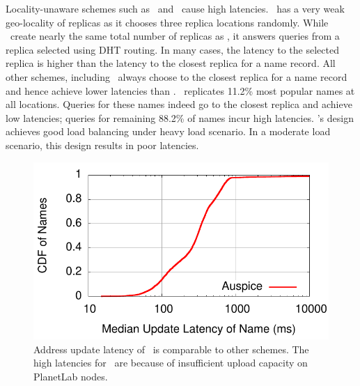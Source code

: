 
Locality-unaware schemes such as \staticthree\ and \codons\ cause high latencies. \staticthree\ has a very weak geo-locality of replicas as it chooses three replica locations randomly. While \codons\ create nearly the same total number of replicas as \auspice,  it  answers queries from a replica selected using DHT routing. In many cases, the latency to the selected replica  is higher than the latency to the closest replica for a name record. All other schemes, including \staticthree\ always choose to the closest replica for a name record and hence achieve lower latencies than \codons.  \codons\ replicates 11.2\%   most popular names at all locations. Queries for these names indeed go to the closest replica and achieve low latencies; queries for remaining 88.2\% of names incur high latencies. \codons's design achieves good load balancing under heavy load scenario. In a moderate load scenario, this design results in poor latencies.




\begin{figure}
\centering
\includegraphics[scale=0.45]{graph/system-exp/cdf-names-median-update.pdf}
\caption{Address update latency of \auspice\ is comparable to other schemes. The high latencies for \replicateall\ are because of insufficient upload capacity on PlanetLab nodes.}
\label{fig:udpates}
\end{figure}


